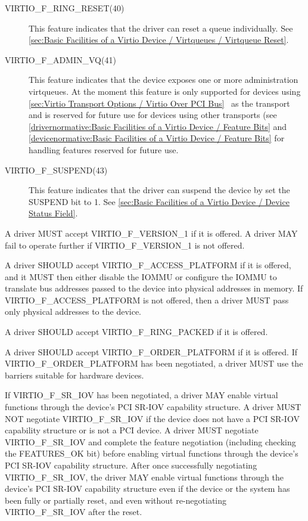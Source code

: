 \begin{description}
  \item[VIRTIO_F_RING_RESET(40)] This feature indicates
  that the driver can reset a queue individually.
  See \ref{sec:Basic Facilities of a Virtio Device / Virtqueues / Virtqueue Reset}.

  \item[VIRTIO_F_ADMIN_VQ(41)] This feature indicates that the device exposes one or more
  administration virtqueues.
  At the moment this feature is only supported for devices using
  \ref{sec:Virtio Transport Options / Virtio Over PCI
	  Bus}~
	  as the transport and is reserved for future use for
	  devices using other transports (see
	  \ref{drivernormative:Basic Facilities of a Virtio Device / Feature Bits}
	and
	\ref{devicenormative:Basic Facilities of a Virtio Device / Feature Bits} for
	handling features reserved for future use.

  \item[VIRTIO_F_SUSPEND(43)] This feature indicates that the driver can
   suspend the device by set the SUSPEND bit to 1.
   See \ref{sec:Basic Facilities of a Virtio Device / Device Status Field}.

\end{description}


A driver MUST accept VIRTIO_F_VERSION_1 if it is offered.  A driver
MAY fail to operate further if VIRTIO_F_VERSION_1 is not offered.

A driver SHOULD accept VIRTIO_F_ACCESS_PLATFORM if it is offered, and it MUST
then either disable the IOMMU or configure the IOMMU to translate bus addresses
passed to the device into physical addresses in memory.  If
VIRTIO_F_ACCESS_PLATFORM is not offered, then a driver MUST pass only physical
addresses to the device.

A driver SHOULD accept VIRTIO_F_RING_PACKED if it is offered.

A driver SHOULD accept VIRTIO_F_ORDER_PLATFORM if it is offered.
If VIRTIO_F_ORDER_PLATFORM has been negotiated, a driver MUST use
the barriers suitable for hardware devices.

If VIRTIO_F_SR_IOV has been negotiated, a driver MAY enable
virtual functions through the device's PCI SR-IOV capability
structure.  A driver MUST NOT negotiate VIRTIO_F_SR_IOV if
the device does not have a PCI SR-IOV capability structure
or is not a PCI device.  A driver MUST negotiate
VIRTIO_F_SR_IOV and complete the feature negotiation
(including checking the FEATURES_OK 
bit) before enabling virtual functions through the device's
PCI SR-IOV capability structure.  After once successfully
negotiating VIRTIO_F_SR_IOV, the driver MAY enable virtual
functions through the device's PCI SR-IOV capability
structure even if the device or the system has been fully
or partially reset, and even without re-negotiating
VIRTIO_F_SR_IOV after the reset.

